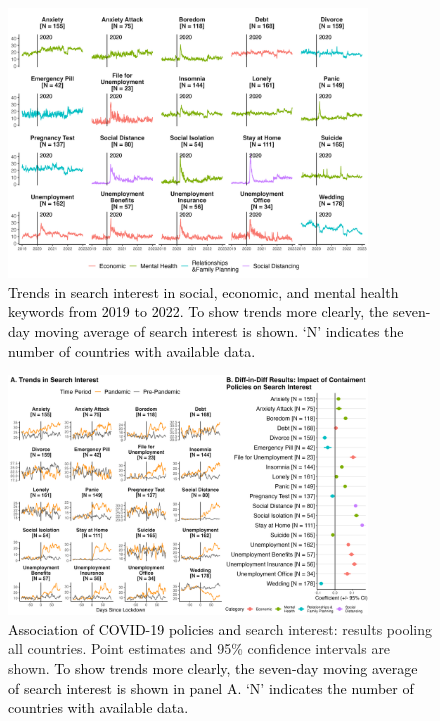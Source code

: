 \documentclass{article}
\begin{document}
\begin{figure}[t]
    \centering
    \includegraphics[width=0.85\textwidth]{figures/contain_long_trends.png}
    \caption{\textcolor{black}{Trends in search interest in social, economic, and mental health keywords from 2019 to 2022. To show trends more clearly, the seven-day moving average of search interest is shown. `N' indicates the number of countries with available data.}}
    \label{fig:contain_trends_long}
\end{figure}

\begin{figure}[t]
    \centering
    \includegraphics[width=0.85\textwidth]{figures/did_overall_90.png}
    \caption{\textcolor{black}{Association of COVID-19 policies and} search interest: results pooling all countries. Point estimates and 95\% confidence intervals are shown. \textcolor{black}{To show trends more clearly, the seven-day moving average of search interest is shown in panel A. `N' indicates the number of countries with available data.}}
    \label{fig:did_overall_90}
\end{figure}
\end{document}
